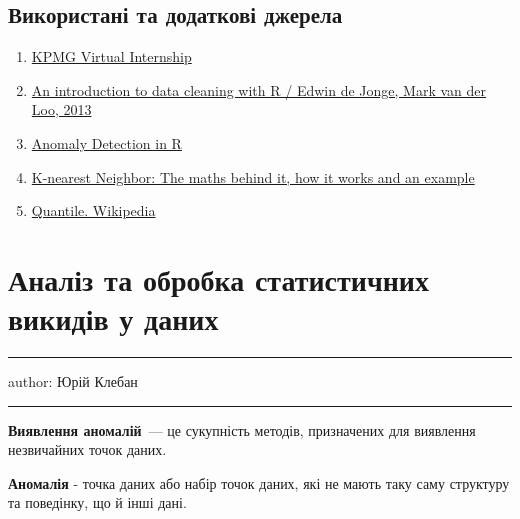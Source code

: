 \documentclass[
  letterpaper,
  DIV=11,
  numbers=noendperiod]{scrreprt}
\providecommand{\tightlist}{%
  \setlength{\itemsep}{0pt}\setlength{\parskip}{0pt}}\usepackage{longtable,booktabs,array}
\begin{document}
\section{Використані та додаткові
джерела}\label{ux432ux438ux43aux43eux440ux438ux441ux442ux430ux43dux456-ux442ux430-ux434ux43eux434ux430ux442ux43aux43eux432ux456-ux434ux436ux435ux440ux435ux43bux430-3}

\begin{enumerate}
\def\labelenumi{\arabic{enumi}.}
\tightlist
\item
  \href{https://www.insidesherpa.com/virtual-internships/m7W4GMqeT3bh9Nb2c}{KPMG
  Virtual Internship}
\item
  \href{https://cran.r-project.org/doc/contrib/de_Jonge+van_der_Loo-Introduction_to_data_cleaning_with_R.pdf}{An
  introduction to data cleaning with R / Edwin de Jonge, Mark van der
  Loo, 2013}
\item
  \href{datacamp.com/courses/anomaly-detection-in-r}{Anomaly Detection
  in R}
\item
  \href{https://medium.com/analytics-vidhya/k-nearest-neighbor-the-maths-behind-it-how-it-works-and-an-example-f1de1208546c}{K-nearest
  Neighbor: The maths behind it, how it works and an example}
\item
  \href{https://en.wikipedia.org/wiki/Quantile}{Quantile. Wikipedia}
\end{enumerate}

\chapter{Аналіз та обробка статистичних викидів у
даних}\label{ux430ux43dux430ux43bux456ux437-ux442ux430-ux43eux431ux440ux43eux431ux43aux430-ux441ux442ux430ux442ux438ux441ux442ux438ux447ux43dux438ux445-ux432ux438ux43aux438ux434ux456ux432-ux443-ux434ux430ux43dux438ux445}

\begin{center}\rule{0.5\linewidth}{0.5pt}\end{center}

author: Юрій Клебан

\begin{center}\rule{0.5\linewidth}{0.5pt}\end{center}

\textbf{Виявлення аномалій}~--- це сукупність методів, призначених для
виявлення незвичайних точок даних.

\textbf{Аномалія} - точка даних або набір точок даних, які не мають таку
саму структуру та поведінку, що й інші дані.
\end{document}
